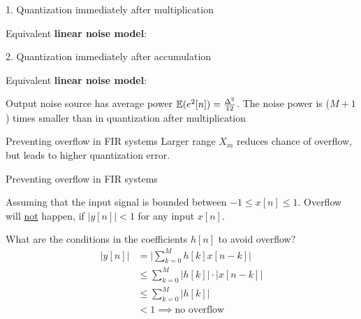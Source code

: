 \documentclass[10pt]{beamer}
\begin{document}
\begin{frame}{1. Quantization immediately after multiplication}
	\begin{center}
		\def\Quantiz{1}
		\resizebox{\textwidth}{!}{}
	\end{center}

	Equivalent \textbf{linear noise model}:
	
	\vspace{-0.25cm}
	\begin{center}
		\def\Quantiz{0}
		\resizebox{\textwidth}{!}{}
	\end{center}
\end{frame}

\begin{frame}{2. Quantization immediately after accumulation}
	\begin{center}
		\def\Quantiz{1}
		\resizebox{\textwidth}{!}{}
	\end{center}
	Equivalent \textbf{linear noise model}:
	
	Output noise source has average power $\operatorname{\mathbb{E}}(e^2[n]) = \frac{\Delta^2}{12}$. The noise power is ($M+1$) times smaller than in quantization after multiplication
	\vspace{-0.5cm}
	\begin{center}
		\def\Quantiz{0}
		\resizebox{\textwidth}{!}{}
	\end{center}
\end{frame}

\begin{frame}{Preventing overflow in FIR systems}
	Larger range $X_m$ reduces chance of overflow, but leads to higher quantization error.
	 \begin{center}
		\resizebox{0.9\textwidth}{!}{}
	\end{center}
\end{frame}

\begin{frame}{Preventing overflow in FIR systems}
	
	Assuming that the input signal is bounded between $-1 \leq x[n] \leq 1$. Overflow will \underline{not} happen, if $|y[n]| < 1$ for any input $x[n]$. 
	
	What are the conditions in the coefficients $h[n]$ to avoid overflow?
	\begin{align*}
		|y[n]| &= \bigg|\sum_{k = 0}^{M} h[k]x[n-k]\bigg| \tag{modulus of convolution sum} \\
		&\leq \sum_{k = 0}^{M} |h[k]|\cdot|x[n-k]| \tag{Schwarz inequality} \\
		&\leq \sum_{k = 0}^{M} |h[k]| \tag{since $-1 \leq x[n] \leq 1$} \\
		& < 1 \implies \text{no overflow}
	\end{align*}
\end{frame}
\end{document}
